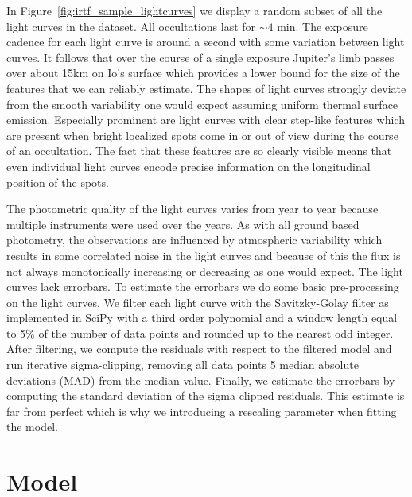 \documentclass[modern]{aastex62}
\begin{document}
In Figure~\ref{fig:irtf_sample_lightcurves} we display a random subset of all the light curves
in the dataset.
All occultations last for $\sim4$ min.
The exposure cadence for each light curve is around a second with some variation between light curves.
It follows that over the course of a single exposure Jupiter's limb passes over about 15km on Io's surface which provides a lower bound for the size of the features that we can reliably estimate.
The shapes of light curves strongly deviate from the smooth variability one would expect assuming uniform thermal surface emission.
Especially prominent are light curves with clear step-like features which are present when bright localized spots come in or out of view during the course of an occultation.
The fact that these features are so clearly visible means that even individual light curves encode precise information on the longitudinal position of the spots.

The photometric quality of the light curves varies from year to year because multiple instruments were used over the years. 
As with all ground based photometry, the observations are influenced by atmospheric variability which results in some correlated noise in the light curves and because of this the flux is not always monotonically increasing or decreasing as one would expect.
The light curves lack errorbars. 
To estimate the errorbars we do some basic pre-processing on the light curves. 
We filter each light curve with the Savitzky-Golay filter as implemented in \textsf{SciPy} \citep{virtanen2020} with
a third order polynomial and a window length equal to 5\% of the number of data points and rounded up to the nearest odd integer. 
After filtering, we compute the residuals with respect to the filtered model and run iterative sigma-clipping, removing all data points 5 median absolute deviations (MAD) from the median value. 
Finally, we estimate the errorbars by computing the standard deviation of the sigma clipped residuals.
This estimate is far from perfect which is why we introducing a rescaling parameter when fitting the model.


\section{Model}
\label{sec:model}
\end{document}
